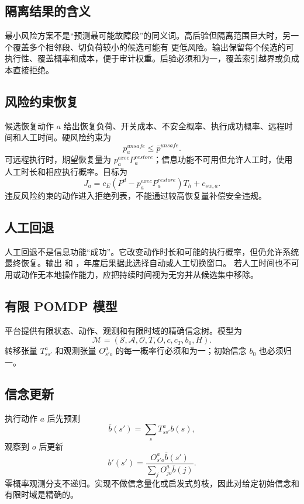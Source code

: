 \subsection{隔离结果的含义}
最小风险方案不是“预测最可能故障段”的同义词。高后验但隔离范围巨大时，另一个覆盖多个相邻段、切负荷较小的候选可能有
更低风险。输出保留每个候选的可执行性、覆盖概率和成本，便于审计权重。后验必须和为一，覆盖索引越界或负成本直接拒绝。

\subsection{风险约束恢复}
候选恢复动作 $a$ 给出恢复负荷、开关成本、不安全概率、执行成功概率、远程时间和人工时间。硬风险约束为
\begin{equation}
 p_a^{unsafe}\le\overline p^{unsafe}.
\end{equation}
可远程执行时，期望恢复量为 $p_a^{exec}P_a^{restore}$；信息功能不可用但允许人工时，使用人工时长和相应执行概率。目标为
\begin{equation}
 J_a=c_E\left(P^{d}-p_a^{exec}P_a^{restore}\right)T_h+c_{sw,a}.
\end{equation}
违反风险约束的动作进入拒绝列表，不能通过较高恢复量补偿安全违规。

\subsection{人工回退}
人工回退不是信息功能“成功”。它改变动作时长和可能的执行概率，但仍允许系统最终恢复。输出
 和 ，年度后果据此选择自动或人工切换窗口。
若人工时间也不可用或动作无本地操作能力，应把持续时间视为无穷并从候选集中移除。

\subsection{有限 POMDP 模型}
平台提供有限状态、动作、观测和有限时域的精确信念树。模型为
\begin{equation}
 \mathcal M=(\mathcal S,\mathcal A,\mathcal O,T,O,c,c_T,b_0,H).
\end{equation}
转移张量 $T^a_{ss'}$ 和观测张量 $O^a_{s'o}$ 的每一概率行必须和为一；初始信念 $b_0$ 也必须归一。

\subsection{信念更新}
执行动作 $a$ 后先预测
\begin{equation}
 \bar b(s')=\sum_sT^a_{ss'}b(s),
\end{equation}
观察到 $o$ 后更新
\begin{equation}
 b'(s')=\frac{O^a_{s'o}\bar b(s')}
 {\sum_jO^a_{jo}\bar b(j)}.
\end{equation}
零概率观测分支不递归。实现不做信念量化或启发式剪枝，因此对给定初始信念和有限时域是精确的。


